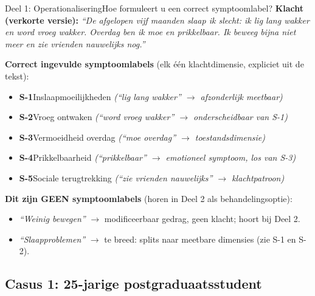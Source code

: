 \documentclass[11pt,a4paper]{article}
\begin{document}
\vspace{0.5em}
\nopagebreak[4]

\begin{voorbeeldbox}{Deel 1: Operationalisering}{Hoe formuleert u een correct symptoomlabel?}
\small
\textbf{Klacht (verkorte versie):} \textit{``De afgelopen vijf maanden slaap ik slecht:
ik lig lang wakker en word vroeg wakker. Overdag ben ik moe en prikkelbaar. Ik beweeg
bijna niet meer en zie vrienden nauwelijks nog.''}

\medskip
\textbf{Correct ingevulde symptoomlabels} (elk één klachtdimensie, expliciet uit de tekst):
\begin{itemize}[topsep=2pt,itemsep=1pt]
\item \textbf{S-1}\enspace Inslaapmoeilijkheden
  \hfill\textit{(``lig lang wakker'' $\rightarrow$ afzonderlijk meetbaar)}
\item \textbf{S-2}\enspace Vroeg ontwaken
  \hfill\textit{(``word vroeg wakker'' $\rightarrow$ onderscheidbaar van S-1)}
\item \textbf{S-3}\enspace Vermoeidheid overdag
  \hfill\textit{(``moe overdag'' $\rightarrow$ toestandsdimensie)}
\item \textbf{S-4}\enspace Prikkelbaarheid
  \hfill\textit{(``prikkelbaar'' $\rightarrow$ emotioneel symptoom, los van S-3)}
\item \textbf{S-5}\enspace Sociale terugtrekking
  \hfill\textit{(``zie vrienden nauwelijks'' $\rightarrow$ klachtpatroon)}
\end{itemize}

\medskip
\textbf{\color{StrongRed}Dit zijn GEEN symptoomlabels} (horen in Deel 2 als behandelingsoptie):
\begin{itemize}[topsep=1pt,itemsep=0pt]
\item \textit{``Weinig bewegen''} $\rightarrow$ modificeerbaar gedrag, geen klacht; hoort bij Deel 2.
\item \textit{``Slaapproblemen''} $\rightarrow$ te breed: splits naar meetbare dimensies (zie S-1 en S-2).
\end{itemize}
\end{voorbeeldbox}

\vspace{0.5em}

\newpage

\subsection*{Casus 1: 25-jarige postgraduaatsstudent}
\end{document}
